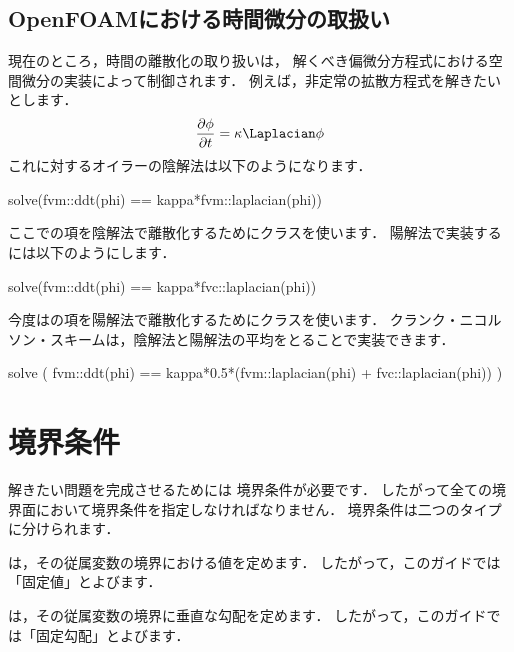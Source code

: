\subsection{OpenFOAMにおける時間微分の取扱い}
\label{ssec:2.5.1}
%  
現在のところ，時間の離散化の取り扱いは，
解くべき偏微分方程式における空間微分の実装によって制御されます．
例えば，非定常の拡散方程式を解きたいとします．
\begin{align}
 \label{eq:2.37}
 \frac{\partial\phi}{\partial t} = \kappa\Laplacian\phi
\end{align}
これに対するオイラーの陰解法は以下のようになります．
\begin{OFverbatim}[file]
solve(fvm::ddt(phi) == kappa*fvm::laplacian(phi))
\end{OFverbatim}
ここでの項を陰解法で離散化するためにクラスを使います．
陽解法で実装するには以下のようにします．
\begin{OFverbatim}[file]
solve(fvm::ddt(phi) == kappa*fvc::laplacian(phi))
\end{OFverbatim}
今度はの項を陽解法で離散化するためにクラスを使います．
クランク・ニコルソン・スキームは，陰解法と陽解法の平均をとることで実装できます．
\begin{OFverbatim}[file]
solve
    (
    fvm::ddt(phi)
    ==
    kappa*0.5*(fvm::laplacian(phi) + fvc::laplacian(phi))
    )
\end{OFverbatim}



\section{境界条件}
\label{sec:2.6}
解きたい問題を完成させるためには
%
境界条件が必要です．
したがって全ての境界面において境界条件を指定しなければなりません．
境界条件は二つのタイプに分けられます．
\begin{description}
%
%
 \item[ディリクレ条件] は，その従属変数の境界における値を定めます．
            したがって，このガイドでは「固定値」とよびます．
%
%
 \item[ノイマン条件] は，その従属変数の境界に垂直な勾配を定めます．
            したがって，このガイドでは「固定勾配」とよびます．
\end{description}

